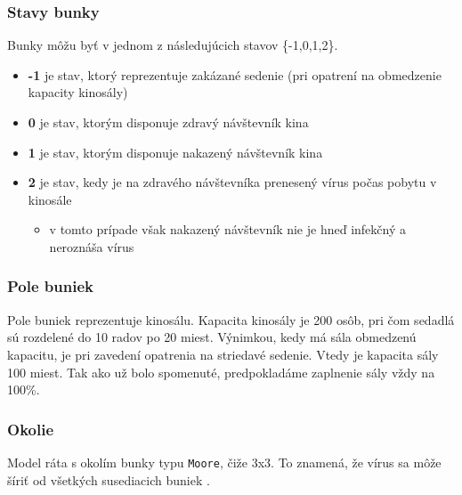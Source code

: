 \documentclass[a4paper, 11pt]{article}
\begin{document}
        \subsubsection{Stavy bunky}
        Bunky môžu byť v jednom z následujúcich stavov \{-1,0,1,2\}.
        \begin{itemize}
            \item \textbf{-1} je stav, ktorý reprezentuje zakázané sedenie (pri opatrení na obmedzenie kapacity kinosály)
            \item \textbf{0} je stav, ktorým disponuje zdravý návštevník kina
            \item \textbf{1} je stav, ktorým disponuje nakazený návštevník kina
            \item \textbf{2} je stav, kedy je na zdravého návštevníka prenesený vírus počas pobytu v kinosále
            \begin{itemize}
                \item v tomto prípade však nakazený návštevník nie je hneď infekčný a neroznáša vírus
            \end{itemize}
        \end{itemize}
        
        \subsubsection{Pole buniek}
        Pole buniek reprezentuje kinosálu. Kapacita kinosály je 200 osôb, pri čom sedadlá sú rozdelené do 10 radov po 20 miest. Výnimkou, kedy má sála obmedzenú kapacitu, je pri zavedení opatrenia na striedavé sedenie. Vtedy je kapacita sály 100 miest. Tak ako už bolo spomenuté, predpokladáme zaplnenie sály vždy na 100\%.
        
        \subsubsection{Okolie}
        Model ráta s okolím bunky typu \texttt{Moore}, čiže 3x3. To znamená, že vírus sa môže šíriť od všetkých susediacich buniek \cite{petrperingermartinhruby}.
    
    
	\newpage
    
    \renewcommand{\refname}{Bibliografia}
    \label{sec:bib}
    
\end{document}
